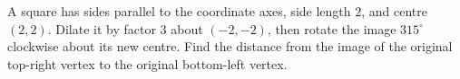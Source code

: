 A square has sides parallel to the coordinate axes, side length $2$, and centre $(2,2)$. Dilate it by factor $3$ about $(-2,-2)$, then rotate the image $315^\circ$ clockwise about its new centre. Find the distance from the image of the original top-right vertex to the original bottom-left vertex.
